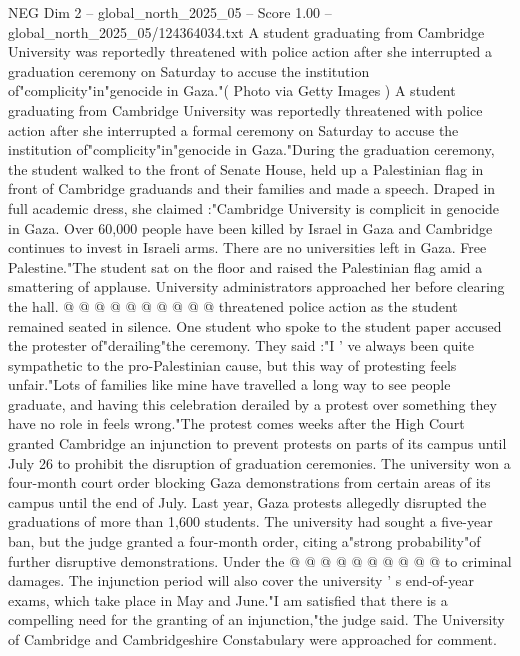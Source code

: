 \begin{textsample}{NEG Dim 2 – global\_north\_2025\_05 – Score 1.00 – global\_north\_2025\_05/124364034.txt}  \label{ex:f2_neg_233}
A student graduating from Cambridge University was reportedly threatened with police action after she interrupted a graduation ceremony on Saturday to accuse the institution of"complicity"in"genocide in Gaza."( Photo via Getty Images ) A student graduating from Cambridge University was reportedly threatened with police action after she interrupted a formal ceremony on Saturday to accuse the institution of"complicity"in"genocide in Gaza."During the graduation ceremony, the student walked to the front of Senate House, held up a Palestinian flag in front of Cambridge graduands and their families and made a speech.
Draped in full academic dress, she claimed :"Cambridge University is complicit in genocide in Gaza.
Over 60,000 people have been killed by Israel in Gaza and Cambridge continues to invest in Israeli arms.
There are no universities left in Gaza.
Free Palestine."The student sat on the floor and raised the Palestinian flag amid a smattering of applause.
University administrators approached her before clearing the hall. @ @ @ @ @ @ @ @ @ @ threatened police action as the student remained seated in silence.
One student who spoke to the student paper accused the protester of"derailing"the ceremony.
They said :"I ' ve always been quite sympathetic to the pro-Palestinian cause, but this way of protesting feels unfair."Lots of families like mine have travelled a long way to see people graduate, and having this celebration derailed by a protest over something they have no role in feels wrong."The protest comes weeks after the High Court granted Cambridge an injunction to prevent protests on parts of its campus until July 26 to prohibit the disruption of graduation ceremonies.
The university won a four-month court order blocking Gaza demonstrations from certain areas of its campus until the end of July.
Last year, Gaza protests allegedly disrupted the graduations of more than 1,600 students.
The university had sought a five-year ban, but the judge granted a four-month order, citing a"strong probability"of further disruptive demonstrations.
Under the @ @ @ @ @ @ @ @ @ @ to criminal damages.
The injunction period will also cover the university ' s end-of-year exams, which take place in May and June."I am satisfied that there is a compelling need for the granting of an injunction,"the judge said.
The University of Cambridge and Cambridgeshire Constabulary were approached for comment.

\end{textsample}
